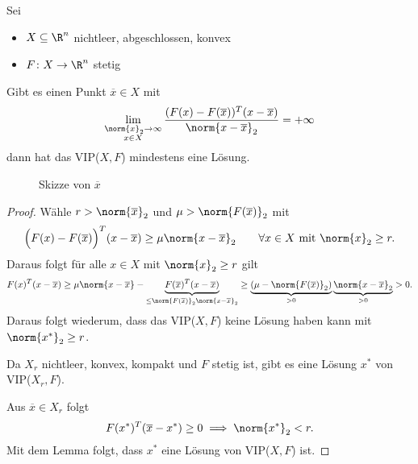 \begin{satz}
	Sei
	\begin{itemize}
		\item $X \subseteq \R^{n}$ nichtleer, abgeschlossen, konvex
		\item $F \colon X \rightarrow \R^{n} $ stetig
	\end{itemize}
	Gibt es einen Punkt $\overline{x} \in X$ mit
	\[
		\lim_{\substack{\norm{x}_{2} \rightarrow \infty \\ x \in X}} \frac{(F(x) - F(\overline{x}))^{T}(x-\overline{x})}{\norm{x-\overline{x}}_{2} } = + \infty
	\] 
	dann hat das VIP($X,F$) mindestens eine Lösung.
\end{satz}

\begin{figure}[H]
	\begin{center}
		
	\end{center}
	\caption{Skizze von $\overline{x}$}
	\label{fig:XR3}
\end{figure}
	
\begin{proof}
	Wähle $r > \norm{\overline{x}}_{2} $ und $\mu > \norm{F(\overline{x})} _{2}$ mit
	\[
		\Big( F(x) - F(\overline{x}) \Big) ^{T}(x-\overline{x}) \geq  \mu  \norm{x -\overline{x}} _{2} \qquad \forall x \in X \text{ mit } \norm{x} _{2} \geq  r
	.\] 
	Daraus folgt für alle $x \in X$ mit $\norm{x} _{2}\geq r$ gilt
	\[
		F(x)^{T}(x-\overline{x}) \geq  \mu \norm{x-\overline{x}} - \underbrace{F(\overline{x})^{T}(x-\overline{x})}_{\leq \norm{F(\overline{x})} _{2}\norm{x-\overline{x}} _{2}} \geq \underbrace{(\mu -\norm{F(\overline{x})} _{2})}_{>0} \underbrace{\norm{x-\overline{x}} _{2}}_{>0} >0
	.\] 
	Daraus folgt wiederum, dass das VIP($X,F$) keine Lösung haben kann mit $\norm{{x}^{*}} _{2}\geq  r$.

	Da $X_{r}$ nichtleer, konvex, kompakt und $F$ stetig ist, gibt es eine Lösung ${x}^{*}$ von VIP($X_{r},F$).

	Aus $\overline{x} \in X_{r}$ folgt
	\[
		F({x}^{*})^{T}(\overline{x}-{x}^{*})\geq 0 \implies \norm{{x}^{*}} _{2}< r
	.\] 
	Mit dem Lemma folgt, dass ${x}^{*}$ eine Lösung von VIP($X,F$) ist.
\end{proof}
